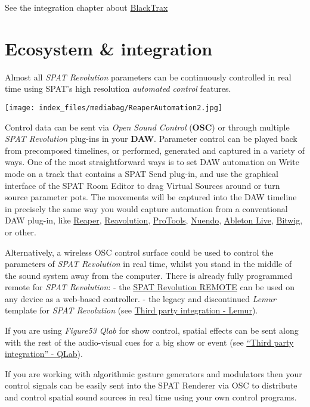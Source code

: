 \documentclass[
  letterpaper,
  DIV=11,
  numbers=noendperiod]{scrreport}
\begin{document}
See the integration chapter about
\href{ThirdParty_BlackTrax.md}{BlackTrax}

\part{Ecosystem \& integration}

Almost all \emph{SPAT Revolution} parameters can be continuously
controlled in real time using SPAT's high resolution \emph{automated
control} features.

\texttt{[image: index\_files/mediabag/ReaperAutomation2.jpg]}

Control data can be sent via \emph{Open Sound Control} (\textbf{OSC}) or
through multiple \emph{SPAT Revolution} plug-ins in your \textbf{DAW}.
Parameter control can be played back from precomposed timelines, or
performed, generated and captured in a variety of ways. One of the most
straightforward ways is to set DAW automation on Write mode on a track
that contains a SPAT Send plug-in, and use the graphical interface of
the SPAT Room Editor to drag Virtual Sources around or turn source
parameter pots. The movements will be captured into the DAW timeline in
precisely the same way you would capture automation from a conventional
DAW plug-in, like \href{Third_Party_Cockos_Reaper.md}{Reaper},
\href{Third_Party_ReaVolution.md}{Reavolution},
\href{Third_Party_ProTools.md}{ProTools},
\href{Third_Party_AbletonLive.md}{Nuendo},
\href{Third_Party_Nuendo.md}{Ableton Live},
\href{Third_Party_Bitwig_Studio.md}{Bitwig}, or other.

Alternatively, a wireless OSC control surface could be used to control
the parameters of \emph{SPAT Revolution} in real time, whilst you stand
in the middle of the sound system away from the computer. There is
already fully programmed remote for \emph{SPAT Revolution}: - the
\href{ThirdParty_SPATRevolution_Remote}{SPAT Revolution REMOTE} can be
used on any device as a web-based controller. - the legacy and
discontinued \emph{Lemur} template for \emph{SPAT Revolution} (see
\href{ThirdParty_Tablet_Remote.md}{Third party integration - Lemur}).

If you are using \emph{Figure53 Qlab} for show control, spatial effects
can be sent along with the rest of the audio-visual cues for a big show
or event (see \href{Third_Party_Figure53_QLab.md}{``Third party
integration'' - QLab}).

If you are working with algorithmic gesture generators and modulators
then your control signals can be easily sent into the SPAT Renderer via
OSC to distribute and control spatial sound sources in real time using
your own control programs.
\end{document}
